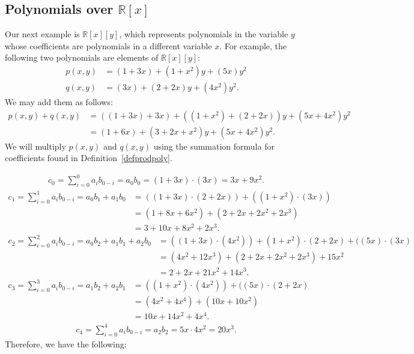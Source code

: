 \subsection*{Polynomials over $\mathbb{R}[x]$}

Our next example is $\mathbb{R}[x][y]$, which represents polynomials in the variable $y$ whose coefficients are polynomials in a different variable $x$.  For example, the following two polynomials are elements of  $\mathbb{R}[x][y]$:
\begin{align*} 
p(x,y) & = (1+3x)+(1+x^2)y+(5x)y^2\\
q(x,y) & = (3x)+(2+2x)y+(4x^2)y^2.
\end{align*}
We may add them as follows:
\begin{align*}
p(x,y) + q(x,y) &=((1+3x)+3x)+((1+x^2)+(2+2x))y+(5x+4x^2)y^2\\
&= (1+6x)+(3+2x+x^2)y+(5x+4x^2 )y^2.
\end{align*}
We will multiply $p(x,y)$ and $q(x,y)$ using the summation formula for coefficients found in Definition~\ref{defprodpoly}.

\begin{align*}
 c_0 = \sum_{i = 0}^0 a_i b_{0 - i} = a_0b_0= (1+3x) \cdot (3x)= 3x+9x^2. 
\end{align*}
\begin{align*}
 c_1 = \sum_{i = 0}^1 a_i b_{0 - i} = a_0b_1+a_1b_0&= ((1+3x) \cdot (2+2x))+((1+x^2)\cdot (3x))\\
&=(1+8x+6x^2)+(2+2x+2x^2+2x^3)\\
&=3+10x+8x^2+2x^3. 
\end{align*}
\begin{align*}
 c_2 = \sum_{i = 0}^2 a_i b_{0 - i} = a_0b_2+a_1b_1+a_2b_0&=((1+3x) \cdot (4x^2))+(1+x^2)\cdot(2+2x)+((5x)\cdot(3x)\\
&= (4x^2+12x^3)+(2+2x+2x^2+2x^3)+15x^2\\
&=2+2x+21x^2+14x^3. 
\end{align*}
\begin{align*}
c_3 = \sum_{i = 0}^3 a_i b_{0 - i} = a_1b_2+a_2b_1&= ((1+x^2) \cdot (4x^2))+((5x)\cdot(2+2x)\\
&=  (4x^2+4x^4)+(10x+10x^2)\\
&=10x+14x^2+4x^4. 
\end{align*}
\begin{align*}
 c_4 = \sum_{i = 0}^4 a_i b_{0 - i} = a_2b_2= 5x \cdot 4x^2= 20x^3. 
\end{align*}
Therefore, we have the following:

